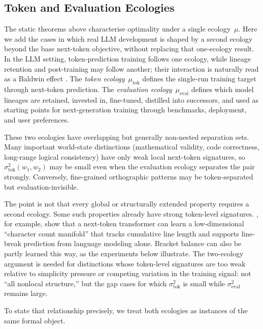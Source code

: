 \documentclass[twoside,11pt]{article}
\newcommand{\sigmasq}{\sigma^2}
\begin{document}
\subsection{Token and Evaluation Ecologies}\label{sec:two-ecology}

The static theorems above characterise optimality under a single ecology~$\mu$. Here we add the cases in which real LLM development is shaped by a second ecology beyond the base next-token objective, without replacing that one-ecology result. In the LLM setting, token-prediction training follows one ecology, while lineage retention and post-training may follow another; their interaction is naturally read as a Baldwin effect \citep{baldwin_1896,hinton_nowlan_1987}. The \emph{token ecology}~$\mu_{\mathrm{tok}}$ defines the single-run training target through next-token prediction. The \emph{evaluation ecology}~$\mu_{\mathrm{eval}}$ defines which model lineages are retained, invested in, fine-tuned, distilled into successors, and used as starting points for next-generation training through benchmarks, deployment, and user preferences.

These two ecologies have overlapping but generally non-nested separation sets. Many important world-state distinctions (mathematical validity, code correctness, long-range logical consistency) have only weak local next-token signatures, so $\sigmasq_{\mathrm{tok}}(w_1,w_2)$ may be small even when the evaluation ecology separates the pair strongly. Conversely, fine-grained orthographic patterns may be token-separated but evaluation-invisible.

The point is not that every global or structurally extended property requires a second ecology. Some such properties already have strong token-level signatures. \citet{gurnee_etal_2025_linebreaks}, for example, show that a next-token transformer can learn a low-dimensional ``character count manifold'' that tracks cumulative line length and supports line-break prediction from language modeling alone. Bracket balance can also be partly learned this way, as the experiments below illustrate. The two-ecology argument is needed for distinctions whose token-level signatures are too weak relative to simplicity pressure or competing variation in the training signal: not ``all nonlocal structure,'' but the gap cases for which $\sigmasq_{\mathrm{tok}}$ is small while $\sigmasq_{\mathrm{eval}}$ remains large.

To state that relationship precisely, we treat both ecologies as instances of the same formal object.
\end{document}
